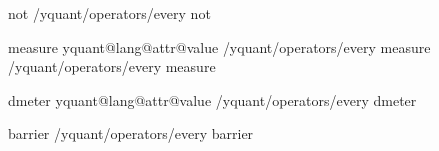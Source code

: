 \yquant@langhelper@declare@command%
   {not}%
   {}%
   {%
      \yquant@prepare%
         {}%
         {/yquant/operators/every not}%
   }

\yquant@langhelper@declare@command@uncontrolled%
   {measure}%
   \yquant@register@get@allowmultitrue%
   {%
      \ifdefined\yquant@lang@attr@type%
         \yquant@register@type@fromstring\yquant@lang@attr@type\yquant@circuit@settype@to%
      \else%
         \let\yquant@circuit@settype@to=\yquant@register@type@c%
      \fi%
      \let\yquant@prepare@callback@prepare=\yquant@circuit@settype@prepare%
      \let\yquant@prepare@callback@draw=\yquant@circuit@settype%
      \unless\ifcsname yquant@lang@attr@value\endcsname%
         \let\yquant@lang@attr@value=\empty%
      \fi%
      \ifdefined\yquant@lang@attr@directcontrol%
         \expandafter\yquant@prepare@injection%
            \expandafter{\yquant@lang@attr@value}%
            {/yquant/operators/every measure}%
      \else%
         \expandafter\yquant@prepare%
            \expandafter{\yquant@lang@attr@value}%
            {/yquant/operators/every measure}%
      \fi%
   }

\yquant@langhelper@declare@command@uncontrolled%
   {dmeter}%
   \yquant@register@get@allowmultitrue%
   {%
      \ifdefined\yquant@lang@attr@type%
         \yquant@register@type@fromstring\yquant@lang@attr@type\yquant@circuit@settype@to%
      \else%
         \let\yquant@circuit@settype@to=\yquant@register@type@c%
      \fi%
      \let\yquant@prepare@callback@prepare=\yquant@circuit@settype@prepare%
      \let\yquant@prepare@callback@draw=\yquant@circuit@settype%
      \unless\ifcsname yquant@lang@attr@value\endcsname%
         \let\yquant@lang@attr@value=\empty%
      \fi%
      \expandafter\yquant@prepare%
         \expandafter{\yquant@lang@attr@value}%
         {/yquant/operators/every dmeter}%
   }

\yquant@langhelper@declare@command@uncontrolled%
   {barrier}%
   \yquant@register@get@allowmultitrue%
   {%
      \yquant@prepare%
         {}%
         {/yquant/operators/every barrier}%
   }%

